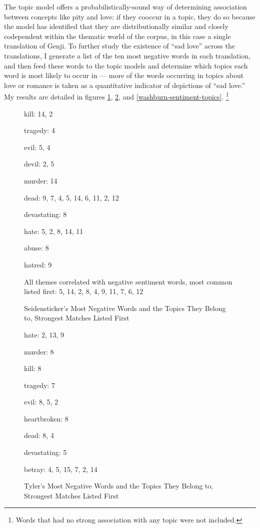 \documentclass[12pt]{article}
\begin{document}
\begin{flushleft}
\begin{spacing}{2.0}
The topic model offers a probabilistically-sound way of determining association between concepts like pity and love: if they cooccur in a topic, they do so because the model has identified that they are distributionally similar and closely codependent within the thematic world of the corpus, in this case a single translation of Genji. To further study the existence of ``sad love'' across the translations, I generate a list of the ten most negative words in each translation, and then feed these words to the topic models and determine which topics each word is most likely to occur in --- more of the words occurring in topics about love or romance is taken as a quantitative indicator of depictions of ``sad love.'' My results are detailed in figures \ref{seidensticker-sentiment-topics}, \ref{tyler-sentiment-topics}, and \ref{washburn-sentiment-topics}. \footnote{Words that had no strong association with any topic were not included.} 

\begin{figure}
	\caption{Seidensticker's Most Negative Words and the Topics They Belong to, Strongest Matches Listed First}
	\label{seidensticker-sentiment-topics}
	kill: 14, 2
	
	tragedy: 4
	
	evil: 5, 4
	
	devil: 2, 5
	
	murder: 14
	
	dead: 9, 7, 4, 5, 14, 6, 11, 2, 12
	
	devastating: 8
	
	hate: 5, 2, 8, 14, 11
	
	abuse: 8
	
	hatred: 9
	
	All themes correlated with negative sentiment words, most common listed first: 5, 14, 2, 8, 4, 9, 11, 7, 6, 12
\end{figure}
\begin{figure}
	\caption{Tyler's Most Negative Words and the Topics They Belong to, Strongest Matches Listed First}
	\label{tyler-sentiment-topics}
	hate: 2, 13, 9
	
	murder: 8
	
	kill: 8
	
	tragedy: 7
	
	evil: 8, 5, 2
	
	heartbroken: 8
	
	dead: 8, 4
	
	devastating: 5
	
	betray: 4, 5, 15, 7, 2, 14
	

\end{figure}
\end{spacing}
\end{flushleft}
\end{document}
